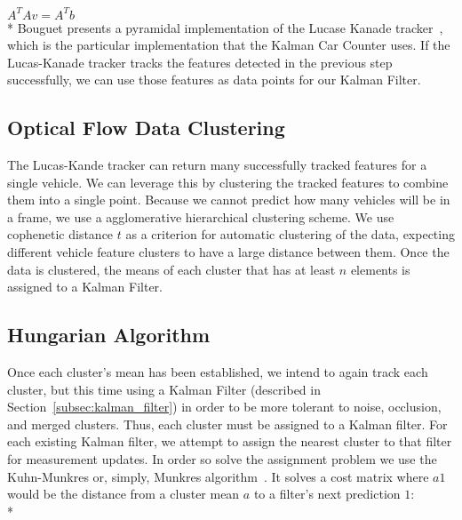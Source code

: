 \documentclass{article} %
\begin{document}
{\centering
$A^T A v=A^T b$\linebreak\newline\\*}
Bouguet presents a pyramidal implementation of the Lucase Kanade tracker~\cite{bouguet2001pyramidal}, which is the particular implementation that the Kalman Car Counter uses. If the Lucas-Kanade tracker tracks the features detected in the previous step successfully, we can use those features as data points for our Kalman Filter.

\subsection{Optical Flow Data Clustering}
\label{subsec:optical_flow}

The Lucas-Kande tracker can return many successfully tracked features for a single vehicle. We can leverage this by clustering the tracked features to combine them into a single point. Because we cannot predict how many vehicles will be in a frame, we use a agglomerative hierarchical clustering scheme. We use cophenetic distance $t$ as a criterion for automatic clustering of the data, expecting different vehicle feature clusters to have a large distance between them. Once the data is clustered, the means of each cluster that has at least $n$ elements is assigned to a Kalman Filter.

\subsection{Hungarian Algorithm}
\label{subsec:hungarian_algo}

Once each cluster's mean has been established, we intend to again track each cluster, but this time using a Kalman Filter (described in Section~\ref{subsec:kalman_filter}) in order to be more tolerant to noise, occlusion, and merged clusters. Thus, each cluster must be assigned to a Kalman filter. For each existing Kalman filter, we attempt to assign the nearest cluster to that filter for measurement updates. In order so solve the assignment problem we use the Kuhn-Munkres or, simply, Munkres algorithm~\cite{munkres1957algorithms}. It solves a cost matrix where $a1$ would be the distance from a cluster mean $a$ to a filter's next prediction $1$:\\*
\end{document}
